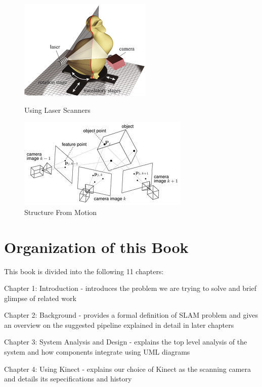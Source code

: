 \begin{figure}[ht]
\begin{minipage}[b]{0.5\linewidth}
\centering
\includegraphics[scale=2.5,keepaspectratio=true]{chap1/intro.png}
\caption{Using Laser Scanners}
\label{fig:intro}
\end{minipage}
\hspace{0.5cm}
\begin{minipage}[b]{0.5\linewidth}
\centering
\includegraphics[scale=0.5,keepaspectratio=true]{chap1/SFM.jpg}
\caption{Structure From Motion}
\label{fig:SFM}
\end{minipage}
\end{figure}

\section{Organization of this Book}

This book is divided into the following 11 chapters:

\hbox{}
Chapter 1: Introduction - introduces the problem we are trying to solve and 
brief glimpse of related work

\hbox{}
Chapter 2: Background - provides a formal definition of SLAM problem and gives an overview on the suggested pipeline explained in detail in later chapters

\hbox{}
Chapter 3: System Analysis and Design - explains the top level analysis of the system and how components integrate using UML diagrams

\hbox{}
Chapter 4: Using Kinect - explains our choice of Kinect as the scanning camera and details its sepecifications and history

